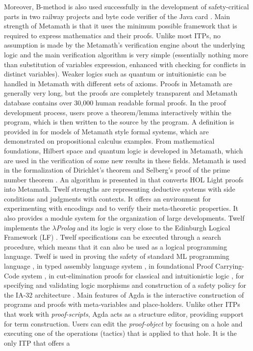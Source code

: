Moreover, B-method is also used successfully in the development of safety-critical parts in 
two railway projects  and byte code verifier of the Java card . 
Main strength of Metamath is that it uses the minimum possible framework that is required to express mathematics and their proofs. 
Unlike most ITPs, 
no assumption is made by the Metamath's verification engine about the underlying logic and the main verification algorithm is very simple (essentially nothing more
than substitution of variables expression, enhanced with checking for conflicts in distinct variables). 
Weaker logics such as quantum or intuitionistic can be handled in Metamath with different sets of axioms. 
Proofs in Metamath are generally very long, but the proofs are completely transparent and Metamath database contains over 30,000 human readable formal proofs.
In the proof development process, users prove a theorem/lemma interactively within the program, which is then written to the source by the program.
A definition is provided in  for models of Metamath style formal systems, which are demonstrated on propositional
calculus examples. 
From mathematical foundations, Hilbert space and quantum logic is developed in Metamath, which are used in the verification of some
new results in these fields. Metamath is used in the formalization of Dirichlet's theorem and Selberg's proof 
of the prime number theorem . 
An algorithm is presented in  that converts HOL Light proofs into Metamath.
Twelf strengths are representing deductive systems with side conditions and judgments with contexts. It offers an environment for experimenting with encodings 
and to verify their meta-theoretic properties. It also provides a module system for the organization of large developments. 
Twelf implements the {\em $\lambda$Prolog}  and its logic is very close to the Edinburgh Logical Framework (LF) . 
Twelf specifications can be executed through a search procedure, which means that it  can also be used as a logical programming language.
Twelf is used in proving the safety of standard ML programming 
language , in typed assembly language system , in foundational Proof Carrying-Code system ,
in cut-elimination proofs for classical and intuitionistic logic , for specifying and validating logic
morphisms  and construction of a safety policy for the IA-32 architecture .
Main features of Agda is the interactive construction of programs and proofs with meta-variables and place-holders. 
Unlike other ITPs that work with {\em proof-scripts}, Agda acts as a structure editor, providing support for term construction. 
Users can edit the {\em proof-object} by focusing on a hole and executing one of the operations (tactics) that is applied to that hole. It is the only ITP that offers a 
